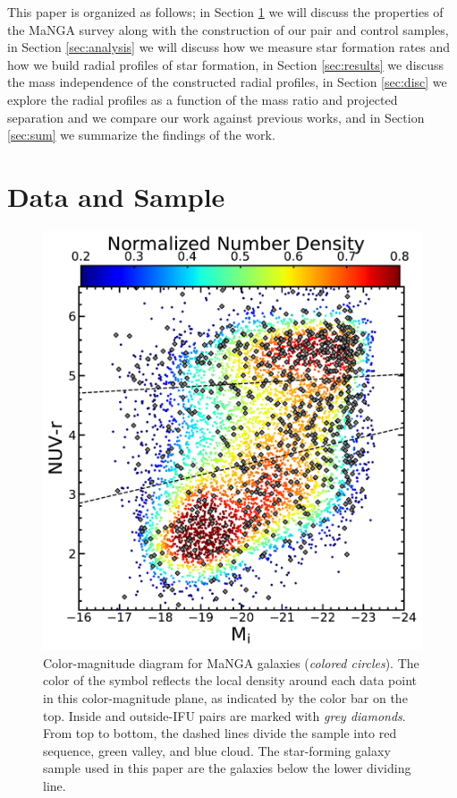 \documentclass[iop,revtex4,twocolumn,apj,numberedappendix,appendixfloats]{emulateapj}
\begin{document}
This paper is organized as follows; in Section \ref{sec:data} we will discuss the properties of the MaNGA survey along with the construction of our pair and control samples, in Section \ref{sec:analysis} we will discuss how we measure star formation rates and how we build radial profiles of star formation, in Section \ref{sec:results} we discuss the mass independence of the constructed radial profiles, in Section \ref{sec:disc} we explore the radial profiles as a function of the mass ratio and projected separation and we compare our work against previous works, and in Section \ref{sec:sum} we summarize the findings of the work. 

\section{Data and Sample}\label{sec:data}

\begin{figure}
\centering
\includegraphics[width=\linewidth]{fig/color-mag.pdf}
\caption[]{Color-magnitude diagram for MaNGA galaxies ({\it colored circles}). The color of the symbol reflects the local density around each data point in this color-magnitude plane, as indicated by the color bar on the top. Inside and outside-IFU pairs are marked with {\it grey diamonds}. From top to bottom, the dashed lines divide the sample into red sequence, green valley, and blue cloud. The star-forming galaxy sample used in this paper are the galaxies below the lower dividing line.}
\label{fig:cmd}
\end{figure}
\end{document}
